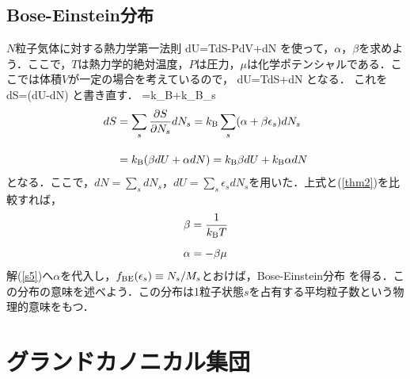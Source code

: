 %
\subsection{Bose-Einstein分布}
$N$粒子気体に対する熱力学第一法則
\be\label{thm}
dU=TdS-PdV+\mu dN
\ee
を使って，$\alpha，\beta$を求めよう．ここで，$T$は熱力学的絶対温度，$P$は圧力，$\mu$は化学ポテンシャルである．ここでは体積$V$が一定の場合を考えているので，
\be\label{thm1}
dU=TdS+\mu dN
\ee
となる．
これを
\be\label{thm2}
dS=(dU-\mu dN)
\ee
と書き直す．
\be
{}=k_{\rm{B}}\alpha+k_{\rm{B}}\beta\epsilon_s
\ee
\begin{align}
dS&=\displaystyle\sum_s\frac{\partial S}{\partial N_s}dN_s
=k_{\rm{B}}\displaystyle\sum_s(\alpha+\beta\epsilon_s)dN_s\\[10pt]
&=k_{\rm{B}}(\beta dU+\alpha dN)=k_{\rm{B}}\beta dU+k_{\rm{B}}\alpha dN
\end{align}
となる．ここで，$dN=\displaystyle\sum_sdN_s，dU=\displaystyle\sum_s\epsilon_sdN_s$を用いた．上式と(\ref{thm2})を比較すれば，
\begin{align}
\beta&=\frac{1}{k_{\rm{B}} T}\\[5pt]
\alpha&=-\beta\mu
\end{align}
解(\ref{s5})へ$\alpha$を代入し，$f_{\rm {BE}}(\epsilon_s)\equiv N_s/M_s$とおけば，Bose-Einstein分布
\be
{}
\ee
を得る．この分布の意味を述べよう．この分布は1粒子状態$s$を占有する平均粒子数という物理的意味をもつ．














%
\section{グランドカノニカル集団}
